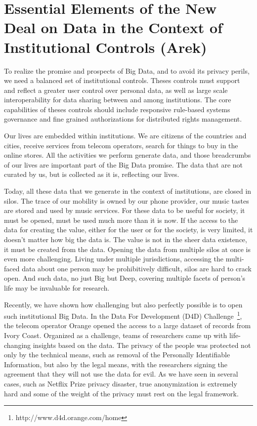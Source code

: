 \section{Essential Elements of the New Deal on Data in the Context of Institutional Controls (Arek)}

To realize the promise and prospects of Big Data, and to avoid its privacy perils, we need a balanced set of institutional controls.
Theses controls must support and reflect a greater user control over personal data, as well as large scale interoperability for data sharing between and among institutions.
The core capabilities of theses controls should include responsive rule-based systems governance and fine grained authorizations for distributed rights management.

Our lives are embedded within institutions. 
We are citizens of the countries and cities, receive services from telecom operators, search for things to buy in the online stores. 
All the activities we perform generate data, and those breadcrumbs of our lives are important part of the Big Data promise.
The data that are not curated by us, but is collected as it is, reflecting our lives.

Today, all these data that we generate in the context of institutions, are closed in silos. 
The trace of our mobility is owned by our phone provider, our music tastes are stored and used by music services.
For these data to be useful for society, it must be opened, must be used much more than it is now.
If the access to the data for creating the value, either for the user or for the society, is very limited, it doesn't matter how big the data is. 
The value is not in the sheer data existence, it must be created from the data.
Opening the data from multiple silos at once is even more challenging.
Living under multiple jurisdictions, accessing the multi-faced data about one person may be prohibitively difficult, silos are hard to crack open.
And such data, no just Big but Deep, covering multiple facets of person's life may be invaluable for research.

Recently, we have shown how challenging but also perfectly possible is to open such institutional Big Data.
In the Data For Development (D4D) Challenge~\footnote{http://www.d4d.orange.com/home}, the telecom operator Orange opened the access to a large dataset of records from Ivory Coast.
Organized as a challenge, teams of researchers came up with life-changing insights based on the data. 
The privacy of the people was protected not only by the technical means, such as removal of the Personally Identifiable Information, but also by the legal means, with the researchers signing the agreement that they will not use the data for evil.
As we have seen in several cases, such as Netflix Prize privacy disaster, true anonymization is extremely hard and some of the weight of the privacy must rest on the legal framework.

